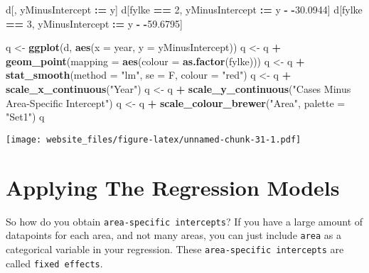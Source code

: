 \documentclass[]{book}
\newenvironment{Shaded}{\begin{snugshade}}{\end{snugshade}}
\newcommand{\KeywordTok}[1]{\textcolor[rgb]{0.13,0.29,0.53}{\textbf{#1}}}
\newcommand{\DataTypeTok}[1]{\textcolor[rgb]{0.13,0.29,0.53}{#1}}
\newcommand{\DecValTok}[1]{\textcolor[rgb]{0.00,0.00,0.81}{#1}}
\newcommand{\FloatTok}[1]{\textcolor[rgb]{0.00,0.00,0.81}{#1}}
\newcommand{\StringTok}[1]{\textcolor[rgb]{0.31,0.60,0.02}{#1}}
\newcommand{\OperatorTok}[1]{\textcolor[rgb]{0.81,0.36,0.00}{\textbf{#1}}}
\newcommand{\ErrorTok}[1]{\textcolor[rgb]{0.64,0.00,0.00}{\textbf{#1}}}
\newcommand{\NormalTok}[1]{#1}
\begin{document}
\begin{Shaded}
\begin{Highlighting}[]
\NormalTok{d[, yMinusIntercept }\OperatorTok{:}\ErrorTok{=}\StringTok{ }\NormalTok{y]}
\NormalTok{d[fylke }\OperatorTok{==}\StringTok{ }\DecValTok{2}\NormalTok{, yMinusIntercept }\OperatorTok{:}\ErrorTok{=}\StringTok{ }\NormalTok{y }\OperatorTok{-}\StringTok{ }\OperatorTok{-}\FloatTok{30.0944}\NormalTok{]}
\NormalTok{d[fylke }\OperatorTok{==}\StringTok{ }\DecValTok{3}\NormalTok{, yMinusIntercept }\OperatorTok{:}\ErrorTok{=}\StringTok{ }\NormalTok{y }\OperatorTok{-}\StringTok{ }\OperatorTok{-}\FloatTok{59.6795}\NormalTok{]}

\NormalTok{q <-}\StringTok{ }\KeywordTok{ggplot}\NormalTok{(d, }\KeywordTok{aes}\NormalTok{(}\DataTypeTok{x =}\NormalTok{ year, }\DataTypeTok{y =}\NormalTok{ yMinusIntercept))}
\NormalTok{q <-}\StringTok{ }\NormalTok{q }\OperatorTok{+}\StringTok{ }\KeywordTok{geom_point}\NormalTok{(}\DataTypeTok{mapping =} \KeywordTok{aes}\NormalTok{(}\DataTypeTok{colour =} \KeywordTok{as.factor}\NormalTok{(fylke)))}
\NormalTok{q <-}\StringTok{ }\NormalTok{q }\OperatorTok{+}\StringTok{ }\KeywordTok{stat_smooth}\NormalTok{(}\DataTypeTok{method =} \StringTok{"lm"}\NormalTok{, }\DataTypeTok{se =}\NormalTok{ F, }\DataTypeTok{colour =} \StringTok{"red"}\NormalTok{)}
\NormalTok{q <-}\StringTok{ }\NormalTok{q }\OperatorTok{+}\StringTok{ }\KeywordTok{scale_x_continuous}\NormalTok{(}\StringTok{"Year"}\NormalTok{)}
\NormalTok{q <-}\StringTok{ }\NormalTok{q }\OperatorTok{+}\StringTok{ }\KeywordTok{scale_y_continuous}\NormalTok{(}\StringTok{"Cases Minus Area-Specific Intercept"}\NormalTok{)}
\NormalTok{q <-}\StringTok{ }\NormalTok{q }\OperatorTok{+}\StringTok{ }\KeywordTok{scale_colour_brewer}\NormalTok{(}\StringTok{"Area"}\NormalTok{, }\DataTypeTok{palette =} \StringTok{"Set1"}\NormalTok{)}
\NormalTok{q}
\end{Highlighting}
\end{Shaded}

\texttt{[image: website\_files/figure-latex/unnamed-chunk-31-1.pdf]}

\section{Applying The Regression
Models}\label{applying-the-regression-models}

So how do you obtain \texttt{area-specific\ intercepts}? If you have a
large amount of datapoints for each area, and not many areas, you can
just include \texttt{area} as a categorical variable in your regression.
These \texttt{area-specific\ intercepts} are called
\texttt{fixed\ effects}.
\end{document}

